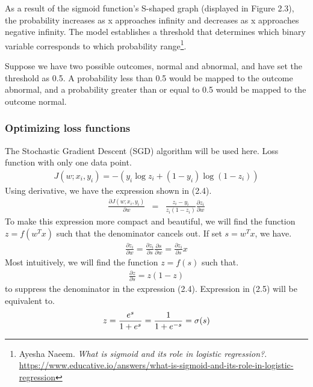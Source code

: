 \newpage
As a result of the sigmoid function's S-shaped graph (displayed in Figure 2.3), the probability increases as x approaches infinity and decreases as x approaches negative infinity. The model establishes a threshold that determines which binary variable corresponds to which probability range\footnote{
	Ayesha Naeem. \textit{What is sigmoid and its role in logistic regression?}. \url{https://www.educative.io/answers/what-is-sigmoid-and-its-role-in-logistic-regression}
}.

Suppose we have two possible outcomes, normal and abnormal, and have set the threshold as 0.5. A probability less than 0.5 would be mapped to the outcome abnormal, and a probability greater than or equal to 0.5 would be mapped to the outcome normal.

\subsubsection{Optimizing loss functions}
\hspace{0.5cm}The Stochastic Gradient Descent (SGD) algorithm will be used here. Loss function with only one data point.
\begin{align*}
	J(w; x_i, y_i) = -(y_i \log {z}_i + (1-y_i) \log (1 - {z}_i))
\end{align*}
\hspace{0.5cm}Using derivative, we have the expression shown in (2.4).
\begin{eqnarray}
	\frac{\partial J(w; x_i, y_i)}{\partial w} 
	&=& \frac{z_i - y_i}{z_i(1 - z_i)} \frac{\partial z_i}{\partial w} 
\end{eqnarray}
\hspace{0.5cm}To make this expression more compact and beautiful, we will find the function 
$z = f(w^T x)$ such that the denominator cancels out. If set $s = w^T x$, we have.
\begin{align*}
	\frac{\partial z_i}{\partial w} = \frac{\partial z_i}{\partial s} \frac{\partial s}{\partial w} = \frac{\partial z_i}{\partial s} x  
\end{align*}
\hspace{0.5cm}Most intuitively, we will find the function $z = f(s)$ such that.
\begin{align}
	\frac{\partial z}{\partial s} = z(1 - z)
\end{align}
to suppress the denominator in the expression (2.4). Expression in (2.5) will be equivalent to.
\begin{align}
	z = \frac{e^s}{1 +e^s} = \frac{1}{1 + e^{-s}} = \sigma(s) \notag 
\end{align}

